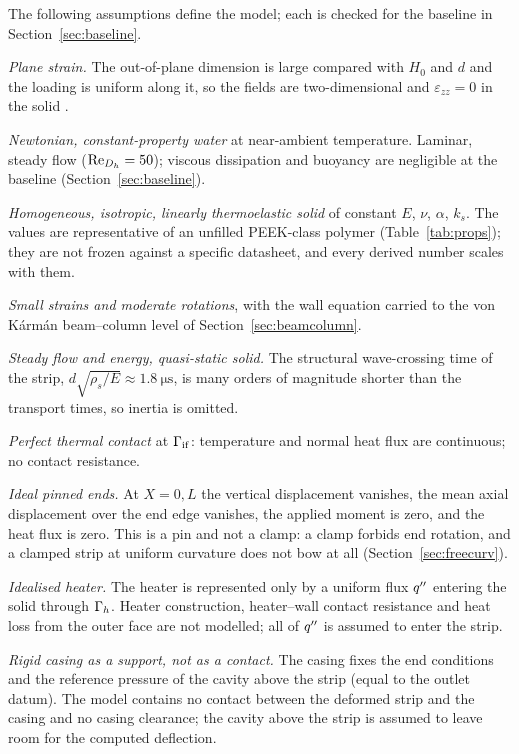 The following assumptions define the model; each is checked for the baseline in
Section~\ref{sec:baseline}.
\begin{description}[leftmargin=0pt,labelindent=0pt,style=unboxed,font=\normalfont\bfseries]
\item[A1] \emph{Plane strain.} The out-of-plane dimension is large compared with $H_0$ and $d$ and
the loading is uniform along it, so the fields are two-dimensional and $\varepsilon_{zz}=0$ in the
solid \citep{boley1960theory,timoshenko1970elasticity}.
\item[A2] \emph{Newtonian, constant-property water} at near-ambient temperature. Laminar, steady
flow ($\mathrm{Re}_{D_h}=50$); viscous dissipation and buoyancy are negligible at the baseline
(Section~\ref{sec:baseline}).
\item[A3] \emph{Homogeneous, isotropic, linearly thermoelastic solid} of constant $E$, $\nu$,
$\alpha$, $k_s$. The values are representative of an unfilled PEEK-class polymer
(Table~\ref{tab:props}); they are not frozen against a specific datasheet, and every derived number
scales with them.
\item[A4] \emph{Small strains and moderate rotations}, with the wall equation carried to the
von K\'arm\'an beam--column level of Section~\ref{sec:beamcolumn}.
\item[A5] \emph{Steady flow and energy, quasi-static solid.} The structural wave-crossing time of the
strip, $d\sqrt{\rho_s/E}\approx\SI{1.8}{\micro\second}$, is many orders of magnitude shorter than the
transport times, so inertia is omitted.
\item[A6] \emph{Perfect thermal contact} at $\Gamma_{\mathrm{if}}$: temperature and normal heat flux are
continuous; no contact resistance.
\item[A7] \emph{Ideal pinned ends.} At $X=0,L$ the vertical displacement vanishes, the mean axial
displacement over the end edge vanishes, the applied moment is zero, and the heat flux is zero. This
is a pin and not a clamp: a clamp forbids end rotation, and a clamped strip at uniform curvature
does not bow at all (Section~\ref{sec:freecurv}).
\item[A8] \emph{Idealised heater.} The heater is represented only by a uniform flux $q^{\prime\prime}$ entering
the solid through $\Gamma_h$. Heater construction, heater--wall contact resistance and heat loss from
the outer face are not modelled; all of $q^{\prime\prime}$ is assumed to enter the strip.
\item[A9] \emph{Rigid casing as a support, not as a contact.} The casing fixes the end conditions and
the reference pressure of the cavity above the strip (equal to the outlet datum). The model contains
no contact between the deformed strip and the casing and no casing clearance; the cavity above the
strip is assumed to leave room for the computed deflection.
\end{description}

